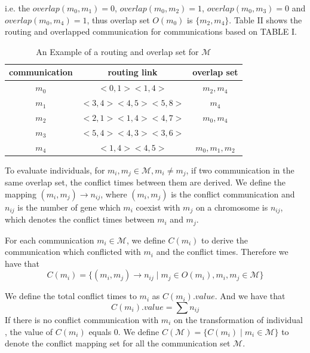 \documentclass[conference]{IEEEtran}
\begin{document}
 i.e. the $overlap(m_{0},m_{1})=0$, $overlap(m_{0},m_{2})=1$, $overlap(m_{0},m_{3})=0$ and $overlap(m_{0},m_{4})=1$, thus overlap set $O(m_{0})$ is $\{ m_{2},m_{4} \}$. Table II shows the routing and overlapped communication for communications based on TABLE I.

\begin{table}[!t]
	\renewcommand{\arraystretch}{1.3}
	\caption{An Example of a routing and overlap set for $\mathcal{M}$}
	\label{t:overlap}
	\centering
	\begin{tabular}{|c||c||c|}
		\hline
		communication & routing link & overlap set\\
		\hline
		$m_{0}$ & $ <0,1><1,4>$ 		& $m_{2},m_{4}$ \\
		\hline
		$m_{1}$ & $ <3,4><4,5><5,8>$	& $m_{4}$ \\
		\hline
		$m_{2}$ & $ <2,1><1,4><4,7>$ 	& $m_{0},m_{4}$ \\
		\hline		
		$m_{3}$ & $ <5,4><4,3><3,6>$ 	& \\
		\hline
		$m_{4}$ & $ <1,4><4,5>$ 		& $m_{0},m_{1},m_{2}$ \\
		\hline		
	\end{tabular}
\end{table}

To evaluate individuals, for $m_{i},m_{j}\in \mathcal{M}, m_{i}\neq m_{j}$, if two communication in the same overlap set, the conflict times between them are derived. We define the mapping $(m_{i},m_{j})\rightarrow n_{ij}$, where $(m_{i},m_{j})$ is the conflict communication and $n_{ij}$ is the number of gene which $m_{i}$ coexist with $m_{j}$ on a chromosome is $n_{ij}$, which denotes the conflict times between $m_{i}$ and $m_{j}$.

For each communication $m_{i}\in\mathcal{M}$, we define $C(m_{i})$ to derive the communication which conflicted with $m_{i}$ and the conflict times. Therefore we have that
\begin{equation}
	C(m_{i}) = 
\{(m_{i},m_{j})\rightarrow n_{ij}\mid m_j\in O(m_{i}),m_{i},m_{j}\in \mathcal{M}\}
\end{equation}

We define the total conflict times to $m_{i}$ as $C(m_i).value$. And we have that
\begin{equation}
	C(m_i).value=\sum n_{ij}
\end{equation}
If there is no conflict communication with $m_i$ on the transformation of individual , the value of $C(m_i)$ equals 0. We define $C(\mathcal{M}) = \{ C(m_i)\mid m_i\in\mathcal{M} \} $ to denote the conflict mapping set for all the communication set $\mathcal{M}$.
\end{document}
